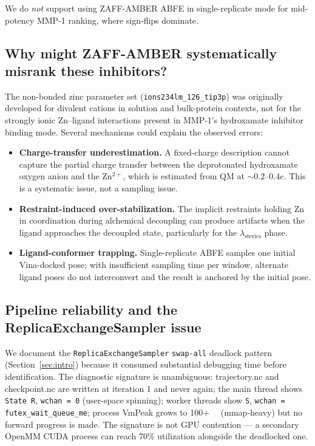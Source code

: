 \documentclass[11pt,a4paper]{article}
\begin{document}
We do \emph{not} support using ZAFF-AMBER ABFE in single-replicate
mode for mid-potency MMP-1 ranking, where sign-flips dominate.

\subsection{Why might ZAFF-AMBER systematically misrank these inhibitors?}

The non-bonded zinc parameter set
(\texttt{ions234lm\_126\_tip3p}) was originally developed for divalent
cations in solution and bulk-protein contexts, not for the strongly
ionic Zn--ligand interactions present in MMP-1's hydroxamate inhibitor
binding mode. Several mechanisms could explain the observed errors:

\begin{itemize}[leftmargin=*]
  \item \textbf{Charge-transfer underestimation.} A fixed-charge
    description cannot capture the partial charge transfer between the
    deprotonated hydroxamate oxygen anion and the Zn$^{2+}$, which is
    estimated from QM at $\sim 0.2$--$0.4 e$. This is a systematic
    issue, not a sampling issue.
  \item \textbf{Restraint-induced over-stabilization.} The implicit
    restraints holding Zn in coordination during alchemical decoupling
    can produce artifacts when the ligand approaches the decoupled
    state, particularly for the $\lambda_{\mathrm{sterics}}$ phase.
  \item \textbf{Ligand-conformer trapping.} Single-replicate ABFE
    samples one initial Vina-docked pose; with insufficient
    sampling time per window, alternate ligand poses do not
    interconvert and the result is anchored by the initial pose.
\end{itemize}

\subsection{Pipeline reliability and the ReplicaExchangeSampler issue}

We document the \texttt{ReplicaExchangeSampler} \texttt{swap-all}
deadlock pattern (Section~\ref{sec:intro}) because it consumed
substantial debugging time before identification. The diagnostic
signature is unambiguous: trajectory.nc and checkpoint.nc are written
at iteration 1 and never again; the main thread shows
\texttt{State R}, \texttt{wchan = 0} (user-space spinning); worker
threads show \texttt{S}, \texttt{wchan = futex\_wait\_queue\_me};
process VmPeak grows to 100+~\unit{\giga\byte} (mmap-heavy) but no
forward progress is made. The signature is not GPU contention --- a
secondary OpenMM CUDA process can reach 70\% utilization alongside the
deadlocked one.
\end{document}
